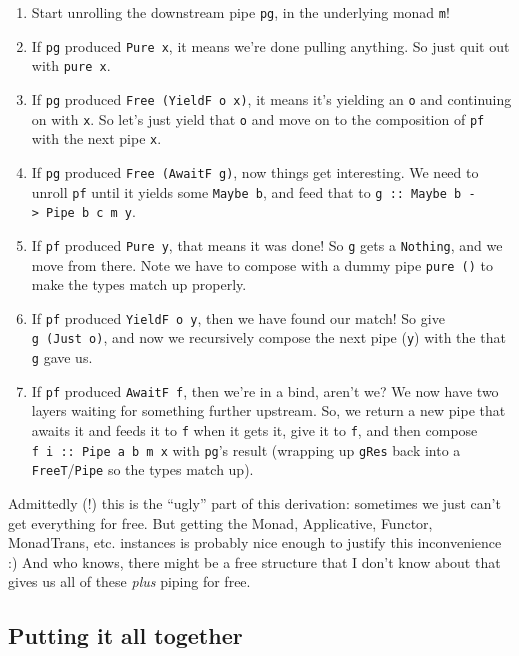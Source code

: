 \documentclass[]{article}
\begin{document}
\begin{enumerate}
\def\labelenumi{\arabic{enumi}.}
\tightlist
\item
  Start unrolling the downstream pipe \texttt{pg}, in the underlying monad
  \texttt{m}!
\item
  If \texttt{pg} produced \texttt{Pure\ x}, it means we're done pulling
  anything. So just quit out with \texttt{pure\ x}.
\item
  If \texttt{pg} produced \texttt{Free\ (YieldF\ o\ x)}, it means it's yielding
  an \texttt{o} and continuing on with \texttt{x}. So let's just yield that
  \texttt{o} and move on to the composition of \texttt{pf} with the next pipe
  \texttt{x}.
\item
  If \texttt{pg} produced \texttt{Free\ (AwaitF\ g)}, now things get
  interesting. We need to unroll \texttt{pf} until it yields some
  \texttt{Maybe\ b}, and feed that to
  \texttt{g\ ::\ Maybe\ b\ -\textgreater{}\ Pipe\ b\ c\ m\ y}.
\item
  If \texttt{pf} produced \texttt{Pure\ y}, that means it was done! So
  \texttt{g} gets a \texttt{Nothing}, and we move from there. Note we have to
  compose with a dummy pipe \texttt{pure\ ()} to make the types match up
  properly.
\item
  If \texttt{pf} produced \texttt{YieldF\ o\ y}, then we have found our match!
  So give \texttt{g\ (Just\ o)}, and now we recursively compose the next pipe
  (\texttt{y}) with the that \texttt{g} gave us.
\item
  If \texttt{pf} produced \texttt{AwaitF\ f}, then we're in a bind, aren't we?
  We now have two layers waiting for something further upstream. So, we return a
  new pipe that awaits it and feeds it to \texttt{f} when it gets it, give it to
  \texttt{f}, and then compose \texttt{f\ i\ ::\ Pipe\ a\ b\ m\ x} with
  \texttt{pg}'s result (wrapping up \texttt{gRes} back into a
  \texttt{FreeT}/\texttt{Pipe} so the types match up).
\end{enumerate}

Admittedly (!) this is the ``ugly'' part of this derivation: sometimes we just
can't get everything for free. But getting the Monad, Applicative, Functor,
MonadTrans, etc. instances is probably nice enough to justify this inconvenience
:) And who knows, there might be a free structure that I don't know about that
gives us all of these \emph{plus} piping for free.

\hypertarget{putting-it-all-together}{%
\subsection{Putting it all together}\label{putting-it-all-together}}
\end{document}
